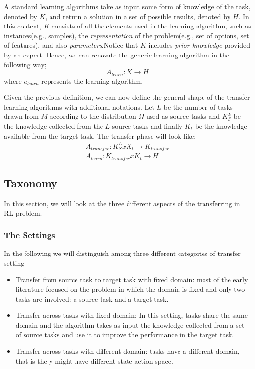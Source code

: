\documentclass{article}
\begin{document}
A standard learning algorithms take as input some form of knowledge of the task, denoted by $K$, and return a solution in a set of possible results, denoted by $H$. In this context, $K$ consists of all the elements used in the learning algorithm, such as instances(e.g., samples), the \textit{representation} of the problem(e.g., set of options, set of features), and also \textit{parameters}.Notice that $K$ includes \textit{prior knowledge} provided by an expert. Hence, we can renovate the generic learning algorithm in the following way;
$$
A_{learn}: K \rightarrow H
$$ where $a_{learn}$ represents the learning algorithm.

Given the previous definition, we can now define the general shape of the transfer learning algorithms with additional notations. Let $L$ be the number of tasks drawn from $M$ according to the distribution $\Omega$ used as source tasks and $K^L_S$ be the knowledge collected from the $L$ source tasks and finally $K_t$ be the knowledge available from the target task. The transfer phase will look like;
\begin{gather}
A_{transfer}: K^L_S x K_t \rightarrow K_{transfer}\\
A_{learn}: K_{transfer} x K_t \rightarrow H    
\end{gather}

\subsection{Taxonomy}
In this section, we will look at the three different aspects of the transferring in RL problem.
\subsubsection{The Settings}
In the following we will distinguish among three different categories of transfer setting
\begin{itemize}
    \item Transfer from source task to target task with fixed domain: most of the early literature focused on the problem in which the domain is fixed and only two tasks are involved: a source task and a target task.
    \item Transfer across tasks with fixed domain: In this setting, tasks share the same domain and the algorithm takes as input the knowledge collected from a set of source tasks and use it to improve the performance in the target task.
    \item Transfer across tasks with different domain: tasks have a different domain, that is the y might have different state-action space.
\end{itemize}
\end{document}
